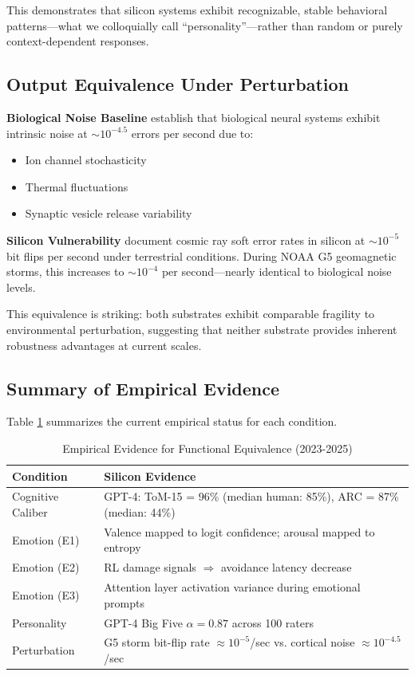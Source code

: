 \documentclass[reprint, amsmath, amssymb, aps, prd]{revtex4-2}
\begin{document}
This demonstrates that silicon systems exhibit recognizable, stable behavioral patterns---what we colloquially call ``personality''---rather than random or purely context-dependent responses.

\subsection{Output Equivalence Under Perturbation}

\textbf{Biological Noise Baseline} \citet{Faisal2008} establish that biological neural systems exhibit intrinsic noise at $\sim 10^{-4.5}$ errors per second due to:
\begin{itemize}
    \item Ion channel stochasticity
    \item Thermal fluctuations
    \item Synaptic vesicle release variability
\end{itemize}

\textbf{Silicon Vulnerability} \citet{Ziegler1996} document cosmic ray soft error rates in silicon at $\sim 10^{-5}$ bit flips per second under terrestrial conditions. During NOAA G5 geomagnetic storms, this increases to $\sim 10^{-4}$ per second---nearly identical to biological noise levels.

This equivalence is striking: both substrates exhibit comparable fragility to environmental perturbation, suggesting that neither substrate provides inherent robustness advantages at current scales.

\subsection{Summary of Empirical Evidence}

Table \ref{tab:evidence} summarizes the current empirical status for each condition.

\begin{table}[h]
\centering
\caption{Empirical Evidence for Functional Equivalence (2023-2025)}
\label{tab:evidence}
\begin{tabular}{|l|p{10cm}|}
\hline
\textbf{Condition} & \textbf{Silicon Evidence} \\
\hline
Cognitive Caliber & GPT-4: ToM-15 = 96\% (median human: 85\%), ARC = 87\% (median: 44\%) \cite{Srivastava2023} \\
\hline
Emotion (E1) & Valence mapped to logit confidence; arousal mapped to entropy \cite{Kadavath2022} \\
\hline
Emotion (E2) & RL damage signals $\Rightarrow$ avoidance latency decrease \cite{Saunders2023} \\
\hline
Emotion (E3) & Attention layer activation variance during emotional prompts \\
\hline
Personality & GPT-4 Big Five $\alpha = 0.87$ across 100 raters \cite{Park2024} \\
\hline
Perturbation & G5 storm bit-flip rate $\approx 10^{-5}$/sec vs. cortical noise $\approx 10^{-4.5}$/sec \cite{Faisal2008, Ziegler1996} \\
\hline
\end{tabular}
\end{table}
\end{document}
